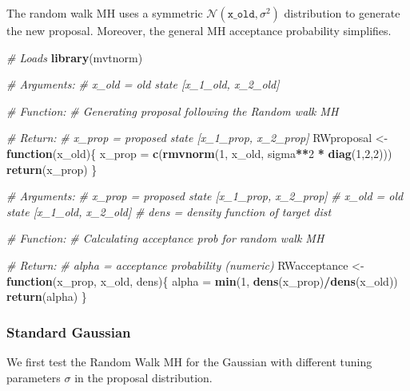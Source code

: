 \documentclass[
]{article}
\newenvironment{Shaded}{\begin{snugshade}}{\end{snugshade}}
\newcommand{\CommentTok}[1]{\textcolor[rgb]{0.56,0.35,0.01}{\textit{#1}}}
\newcommand{\ControlFlowTok}[1]{\textcolor[rgb]{0.13,0.29,0.53}{\textbf{#1}}}
\newcommand{\DecValTok}[1]{\textcolor[rgb]{0.00,0.00,0.81}{#1}}
\newcommand{\KeywordTok}[1]{\textcolor[rgb]{0.13,0.29,0.53}{\textbf{#1}}}
\newcommand{\NormalTok}[1]{#1}
\newcommand{\OperatorTok}[1]{\textcolor[rgb]{0.81,0.36,0.00}{\textbf{#1}}}
\newcommand{\StringTok}[1]{\textcolor[rgb]{0.31,0.60,0.02}{#1}}
\begin{document}
The random walk MH uses a symmetric
\(\mathcal{N}(\texttt{x_old},\sigma^2)\) distribution to generate the
new proposal. Moreover, the general MH acceptance probability
simplifies.

\begin{Shaded}
\begin{Highlighting}[]
\CommentTok{# Loads}
\KeywordTok{library}\NormalTok{(mvtnorm)}

\CommentTok{# Arguments: }
\CommentTok{# x_old = old state [x_1_old, x_2_old]}

\CommentTok{# Function:}
\CommentTok{# Generating proposal following the Random walk MH}

\CommentTok{# Return:}
\CommentTok{# x_prop = proposed state [x_1_prop, x_2_prop]}
\NormalTok{RWproposal <-}\StringTok{ }\ControlFlowTok{function}\NormalTok{(x_old)\{}
\NormalTok{  x_prop =}\StringTok{ }\KeywordTok{c}\NormalTok{(}\KeywordTok{rmvnorm}\NormalTok{(}\DecValTok{1}\NormalTok{, x_old, sigma}\OperatorTok{**}\DecValTok{2} \OperatorTok{*}\StringTok{ }\KeywordTok{diag}\NormalTok{(}\DecValTok{1}\NormalTok{,}\DecValTok{2}\NormalTok{,}\DecValTok{2}\NormalTok{)))}
  \KeywordTok{return}\NormalTok{(x_prop)}
\NormalTok{\}}

\CommentTok{# Arguments: }
\CommentTok{# x_prop = proposed state [x_1_prop, x_2_prop]}
\CommentTok{# x_old = old state [x_1_old, x_2_old]}
\CommentTok{# dens = density function of target dist}

\CommentTok{# Function:}
\CommentTok{# Calculating acceptance prob for random walk MH}

\CommentTok{# Return:}
\CommentTok{# alpha = acceptance probability (numeric)}
\NormalTok{RWacceptance <-}\StringTok{ }\ControlFlowTok{function}\NormalTok{(x_prop, x_old, dens)\{}
\NormalTok{  alpha =}\StringTok{ }\KeywordTok{min}\NormalTok{(}\DecValTok{1}\NormalTok{, }\KeywordTok{dens}\NormalTok{(x_prop)}\OperatorTok{/}\KeywordTok{dens}\NormalTok{(x_old))}
  \KeywordTok{return}\NormalTok{(alpha)}
\NormalTok{\}}
\end{Highlighting}
\end{Shaded}

\hypertarget{standard-gaussian}{%
\subsubsection{Standard Gaussian}\label{standard-gaussian}}

We first test the Random Walk MH for the Gaussian with different tuning
parameters \(\sigma\) in the proposal distribution.
\end{document}
